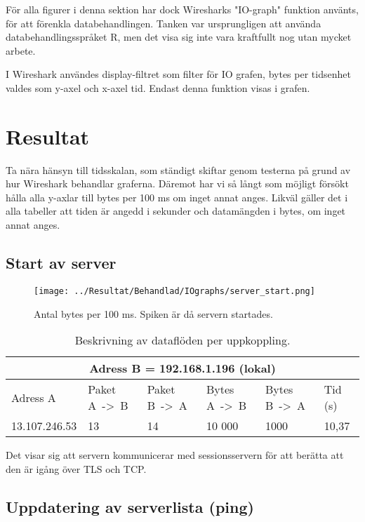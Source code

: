 \documentclass[journal,comsoc]{IEEEtran}
\begin{document}
För alla figurer i denna sektion har dock Wiresharks "IO-graph" funktion använts, för att förenkla databehandlingen. Tanken var ursprungligen att använda databehandlingsspråket R, men det visa sig inte vara kraftfullt nog utan mycket arbete.

I Wireshark användes display-filtret som filter för IO grafen, bytes per tidsenhet valdes som y-axel och x-axel tid. Endast denna funktion visas i grafen.
\section{Resultat}
Ta nära hänsyn till tidsskalan, som ständigt skiftar genom testerna på grund av hur Wireshark behandlar graferna. Däremot har vi så långt som möjligt försökt hålla alla y-axlar till bytes per 100 ms om inget annat anges. Likväl gäller det i alla tabeller att tiden är angedd i sekunder och datamängden i bytes, om inget annat anges. 
\subsection{Start av server}
\begin{figure} [H]
  \centering
  \texttt{[image: ../Resultat/Behandlad/IOgraphs/server\_start.png]}
  \caption{Antal bytes per 100 ms. Spiken är då servern startades.}
  \label{fig:server:start}
\end{figure}
\begin{table} [H]
  \begin{center}
    \label{table:server:start}
    \begin{tabular}{ | m{1.5cm} |  m{1cm} | m{1cm}| m{1cm}|m{1cm}|m{0.5cm}| } 
      \hline
      \multicolumn{6}{|c|}{Adress B = 192.168.1.196 (lokal)} \\
      \hline
      Adress A & Paket A~->~B & Paket B~->~A & Bytes A~->~B & Bytes B~->~A & Tid (s) \\
      \hline
      13.107.246.53 & 13 & 14 & 10 000 & 1000 & 10,37 \\
      \hline   
    \end{tabular}
  \end{center}
  \caption{Beskrivning av dataflöden per uppkoppling.}
\end{table}
Det visar sig att servern kommunicerar med sessionsservern för att berätta att den är igång över TLS och TCP.

\label{test:ping}
\subsection{Uppdatering av serverlista (ping)}
\end{document}

